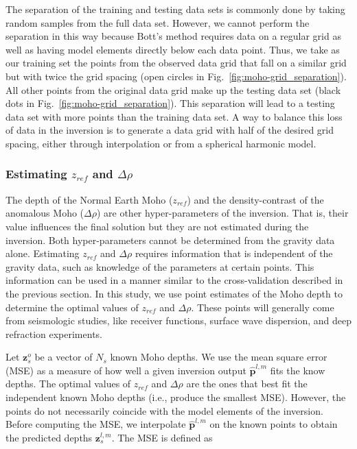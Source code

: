 The separation of the training and testing data sets is commonly done by taking
random samples from the full data set.
However, we cannot perform the separation in this way because
Bott's method requires data on a regular grid as well as having model elements
directly below each data point.
Thus, we take as our training set the points from the observed data grid that
fall on a similar grid but with twice the grid spacing
(open circles in Fig.~\ref{fig:moho-grid_separation}).
All other points from the original data grid
make up the testing data set
(black dots in Fig.~\ref{fig:moho-grid_separation}).
This separation will lead to
a testing data set with more points than the training data set.
A way to balance this loss of data in the inversion
is to generate a data grid with half of the desired grid spacing,
either through interpolation
or from a spherical harmonic model.



\subsubsection{Estimating $z_{ref}$ and $\Delta\rho$}

The depth of the Normal Earth Moho ($z_{ref}$)
and the density-contrast of the anomalous Moho ($\Delta\rho$)
are other hyper-parameters of the inversion.
That is, their value influences the final solution
but they are not estimated during the inversion.
Both hyper-parameters cannot be determined from the gravity data alone.
Estimating $z_{ref}$ and $\Delta\rho$ requires
information that is independent of the gravity data,
such as knowledge of the parameters at certain points.
This information can be used in a manner similar to
the cross-validation described in the previous section.
In this study, we use point estimates of the Moho depth
to determine the optimal values of $z_{ref}$ and $\Delta\rho$.
These points will generally come from seismologic studies,
like receiver functions, surface wave dispersion, and deep refraction
experiments.

Let $\mathbf{z}_s^o$ be a vector of $N_s$ known Moho depths.
We use the mean square error (MSE)
as a measure of how well a given inversion output $\mathbf{\hat{p}}^{l,m}$
fits the know depths.
The optimal values of $z_{ref}$ and $\Delta\rho$
are the ones that best fit the independent known Moho depths
(i.e., produce the smallest MSE).
However, the points do not necessarily coincide
with the model elements of the inversion.
Before computing the MSE,
we interpolate $\mathbf{\hat{p}}^{l,m}$ on the known points
to obtain the predicted depths $\mathbf{z}_s^{l,m}$.
The MSE is defined as

